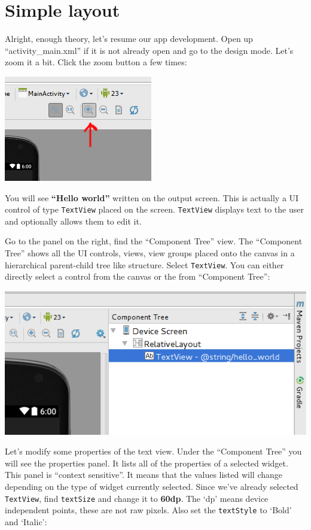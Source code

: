 \section{Simple layout}
Alright, enough theory, let's resume our app development. Open up ``activity\_main.xml'' if it is not already open and go to the design mode. Let's zoom it a bit. Click the zoom button a few times:

\begin{center}
	\includegraphics[scale=0.4]{chapters/ch02/images/14_zoom}
\end{center}

You will see \textbf{“Hello world”} written on the output screen. This is actually a UI control of type \texttt{TextView} placed on the screen. \texttt{TextView} displays text to the user and optionally allows them to edit it.

Go to the panel on the right, find the ``Component Tree'' view. The ``Component Tree'' shows all the UI controls, views, view groups placed onto the canvas in a hierarchical parent-child tree like structure. Select \texttt{TextView}. You can either directly select a control from the canvas or the from ``Component Tree'':

\begin{center}
	\includegraphics[scale=0.4]{chapters/ch02/images/15_component_tree}
\end{center}

Let's modify some properties of the text view. Under the ``Component Tree'' you will see the properties panel. It lists all of the properties of a selected widget. This panel is ``context sensitive''. It means that the values listed will change depending on the type of widget currently selected. Since we've already selected \texttt{TextView}, find \texttt{textSize} and change it to \textbf{60dp}. The `dp' means device independent points, these are not raw pixels. Also set the \texttt{textStyle} to `Bold' and `Italic':

